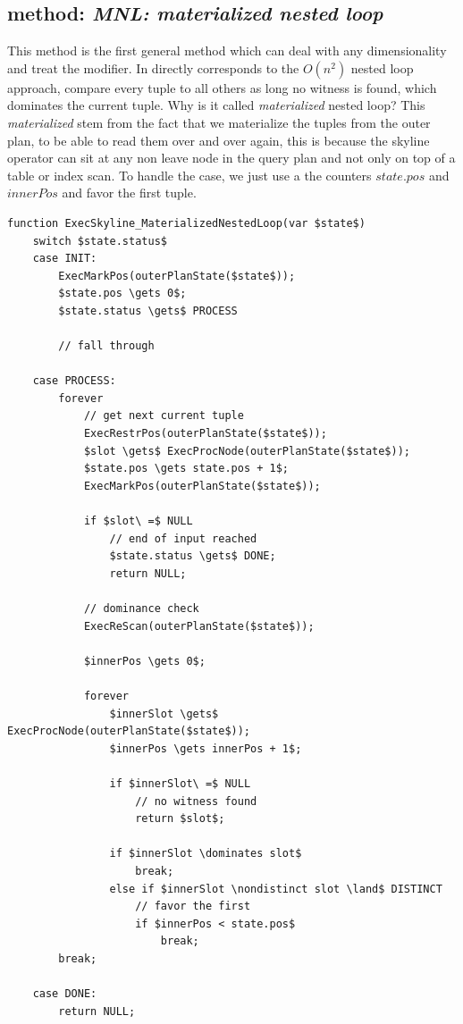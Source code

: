 \subsection{\Naive method: \emph{MNL: materialized nested loop}}
\label{sec:mnl}
This method is the first general method which can deal with any
dimensionality and treat the  modifier.  In
directly corresponds to the \naive $O(n^2)$ nested loop approach,
compare every tuple to all others as long no witness is found, which
dominates the current tuple.  Why is it called \emph{materialized}
nested loop?  This \emph{materialized} stem from the fact that we
materialize the tuples from the outer plan, to be able to read them
over and over again, this is because the skyline operator can sit at
any non leave node in the query plan and not only on top of a table or
index scan.  To handle the  case, we just use a
the counters $state.pos$ and $innerPos$ and favor the first tuple.

\begin{lstlisting}[language=pseudo,
caption={Pseudo-code for MNL},
label={code:mnl}
]
function ExecSkyline_MaterializedNestedLoop(var $state$)
	switch $state.status$
	case INIT:
		ExecMarkPos(outerPlanState($state$));
		$state.pos \gets 0$;
		$state.status \gets$ PROCESS

		// fall through

	case PROCESS:
		forever
			// get next current tuple
			ExecRestrPos(outerPlanState($state$));
			$slot \gets$ ExecProcNode(outerPlanState($state$));
			$state.pos \gets state.pos + 1$;
			ExecMarkPos(outerPlanState($state$));

			if $slot\ =$ NULL
				// end of input reached
				$state.status \gets$ DONE;
				return NULL;

			// dominance check
			ExecReScan(outerPlanState($state$));

			$innerPos \gets 0$;

			forever
				$innerSlot \gets$ ExecProcNode(outerPlanState($state$));
				$innerPos \gets innerPos + 1$;

				if $innerSlot\ =$ NULL
					// no witness found
					return $slot$;

				if $innerSlot \dominates slot$
					break;
				else if $innerSlot \nondistinct slot \land$ DISTINCT
					// favor the first
					if $innerPos < state.pos$
						break;
		break;

	case DONE:
		return NULL;
\end{lstlisting}

